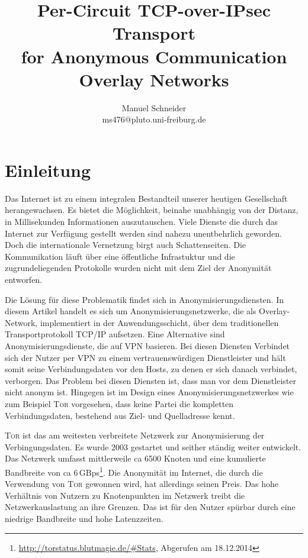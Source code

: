 \documentclass[fleqn,envcountsame,runningheads,10pt,a4paper]{llncs}
\begin{document}
\title{Per-Circuit TCP-over-IPsec Transport\\ for Anonymous Communication Overlay Networks} 
\author{Manuel Schneider\\ms476@pluto.uni-freiburg.de}
\maketitle
\section{Einleitung}
\label{sec:intro}

Das Internet ist zu einem integralen Bestandteil unserer heutigen Gesellschaft herangewachsen. Es bietet die Möglichkeit, beinahe unabhängig von der Distanz, in Millisekunden Informationen auszutauschen. Viele Dienste die durch das Internet zur Verfügung gestellt werden sind nahezu unentbehrlich geworden. Doch die internationale Vernetzung birgt auch Schattenseiten. Die Kommunikation läuft über eine öffentliche Infrastuktur und die zugrundeliegenden Protokolle wurden nicht mit dem Ziel der Anonymität entworfen.

Die Lösung für diese Problematik findet sich in Anonymisierungsdiensten. In diesem Artikel handelt es sich um Anonymisierungsnetzwerke, die als Overlay-Network, implementiert in der Anwendungsschicht, über dem traditionellen Transportprotokoll TCP/IP aufsetzen. Eine Alternative sind Anonymisierungsdienste, die auf VPN basieren. Bei diesen Diensten Verbindet sich der Nutzer per VPN zu einem vertrauenswürdigen Dienstleister und hält somit seine Verbindungsdaten vor den Hosts, zu denen er sich danach verbindet, verborgen. Das Problem bei diesen Diensten ist, dass man vor dem Dienstleister nicht anonym ist. Hingegen ist im Design eines Anonymisierungsnetzwerkes wie zum Beispiel \textsc{Tor} vorgesehen, dass keine Partei die kompletten Verbindungsdaten, bestehend aus Ziel- und Quelladresse kennt.

\textsc{Tor} ist das am weitesten verbreitete Netzwerk zur Anonymisierung der Verbingungsdaten. Es wurde 2003 gestartet und seither ständig weiter entwickelt. Das Netzwerk umfasst mittlerweile ca 6500 Knoten und eine kumulierte Bandbreite von ca 6\,GBps\footnote{\url{http://torstatus.blutmagie.de/\#Stats}, Abgerufen am 18.12.2014}.  Die Anonymität im Internet, die durch die Verwendung von \textsc{Tor} gewonnen wird, hat allerdings seinen Preis. Das hohe Verhältnis von Nutzern zu Knotenpunkten im Netzwerk treibt die Netzwerkauslastung an ihre Grenzen. Das ist für den Nutzer spürbar durch eine niedrige Bandbreite und hohe Latenzzeiten.
\end{document}
